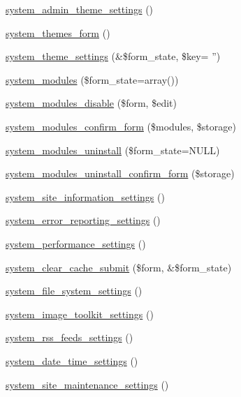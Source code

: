 \begin{CompactItemize}
\item 
\hyperlink{group__forms_g1dd7e9d8accd39dc5991233d9d1b8467}{system\_\-admin\_\-theme\_\-settings} ()
\item 
\hyperlink{group__forms_g8f88b0723dcb0f229a0d8b10687b8059}{system\_\-themes\_\-form} ()
\item 
\hyperlink{group__forms_g7cc637f50b1399befe30a24af784817b}{system\_\-theme\_\-settings} (\&\$form\_\-state, \$key= '')
\item 
\hyperlink{group__forms_gc1f714517f9c92ec183a05d6f07ccdf1}{system\_\-modules} (\$form\_\-state=array())
\item 
\hyperlink{group__forms_ga1c6a106e2cb1667b9aff6986c875fb1}{system\_\-modules\_\-disable} (\$form, \$edit)
\item 
\hyperlink{group__forms_g253f61674ab19c32b0df811c365ae00c}{system\_\-modules\_\-confirm\_\-form} (\$modules, \$storage)
\item 
\hyperlink{group__forms_g6719870584aaef3fa06f2d0c2392daf1}{system\_\-modules\_\-uninstall} (\$form\_\-state=NULL)
\item 
\hyperlink{group__forms_g3006c568c437410b5fedb4c6d68ddbf4}{system\_\-modules\_\-uninstall\_\-confirm\_\-form} (\$storage)
\item 
\hyperlink{group__forms_g80e6b3130e47d51243151f1aa04742a3}{system\_\-site\_\-information\_\-settings} ()
\item 
\hyperlink{group__forms_gc3d206af540977bb598cae42759491bc}{system\_\-error\_\-reporting\_\-settings} ()
\item 
\hyperlink{group__forms_g47b1f34bfff2f44fd22cfc866bff59d7}{system\_\-performance\_\-settings} ()
\item 
\hyperlink{group__forms_g07cc959f377e07b079d9875fc5c4b1b7}{system\_\-clear\_\-cache\_\-submit} (\$form, \&\$form\_\-state)
\item 
\hyperlink{group__forms_gb0199bde08bcb49ff536dd4987718632}{system\_\-file\_\-system\_\-settings} ()
\item 
\hyperlink{group__forms_gefe85833f426aa428f4ac75d641d7631}{system\_\-image\_\-toolkit\_\-settings} ()
\item 
\hyperlink{group__forms_gcff83234fa52dbaaf85c122bd300a374}{system\_\-rss\_\-feeds\_\-settings} ()
\item 
\hyperlink{group__forms_g2c5e3711c4a19fa4759efcee41487070}{system\_\-date\_\-time\_\-settings} ()
\item 
\hyperlink{group__forms_g1f5acd366b9bb206d73876d3686d7fce}{system\_\-site\_\-maintenance\_\-settings} ()

\end{CompactItemize}
